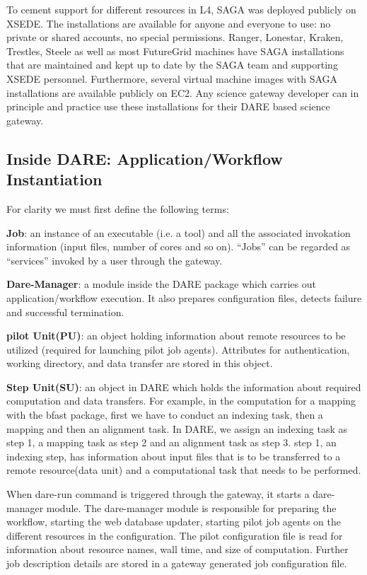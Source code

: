 \documentclass[]{svjour3}
\begin{document}
To cement support for different resources in L4, SAGA was deployed
publicly on XSEDE. The installations are available for anyone and everyone
to use: no private or shared accounts, no special permissions. Ranger,
Lonestar, Kraken, Trestles, Steele as well as most FutureGrid machines
have SAGA installations that are maintained and kept up to date by
the SAGA team and supporting XSEDE personnel. Furthermore, several virtual machine images with
SAGA installations are available publicly on EC2. Any science
gateway developer can in principle and practice use these installations
for their DARE based science gateway.

\subsection{Inside DARE: Application/Workflow Instantiation}

For clarity we must first define the following terms:

\textbf{Job}: an instance of an executable (i.e. a tool) and all the associated
invokation information (input files, number of cores and so on). ``Jobs'' can be
regarded as ``services'' invoked by a user through the gateway.

\textbf{Dare-Manager}: a module inside the DARE package which carries
out application/workflow execution. It also prepares configuration files,
detects failure and successful termination.

\textbf{pilot Unit(PU)}: an object holding information about remote
resources to be utilized (required for launching pilot job agents).
Attributes for authentication, working directory, and data transfer
are stored in this object.

\textbf{Step Unit(SU)}: an object in DARE which holds the information
about required computation and data transfers. For example, in the
computation for a mapping with the bfast package, first we have to
conduct an indexing task, then a mapping and then an alignment task.
In DARE, we assign an indexing task as step 1, a mapping task as step
2 and an alignment task as step 3. step 1, an indexing step, has
information about input files that is to be transferred to a remote
resource(data unit) and a computational task that needs to be
performed.

When dare-run command is triggered through the gateway, it starts a
dare-manager module. The dare-manager module is responsible for preparing the workflow,
starting the web database updater, starting pilot job agents on the
different resources in the configuration. The pilot configuration file is
read for information about resource names, wall time, and size of computation.
Further job description details are stored in a gateway generated job configuration file.
\end{document}
